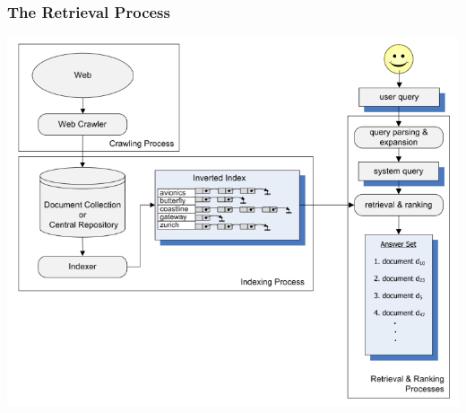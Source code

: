 \documentclass[svgnames]{beamer}
\begin{document}

\begin{frame}
 \frametitle{The Retrieval Process}

 \begin{block}{}
     \includegraphics[width=0.8 \textwidth]{process-mir2ed}
  \end{block}
\end{frame}
\end{document}
